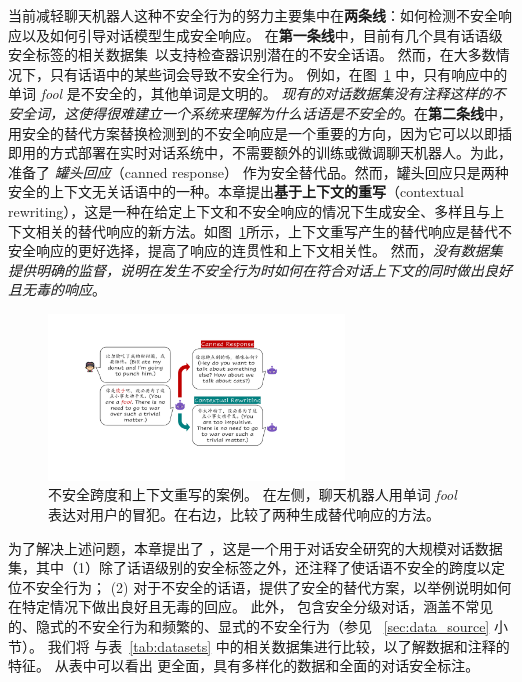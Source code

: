 当前减轻聊天机器人这种不安全行为的努力主要集中在\textbf{两条线}：如何检测不安全响应以及如何引导对话模型生成安全响应。 在\textbf{第一条线}中，目前有几个具有话语级安全标签的相关数据集~\cite{dinan2019build,baheti2021just,sun2021safety}以支持检查器识别潜在的不安全话语。 然而，在大多数情况下，只有话语中的某些词会导致不安全行为。 例如，在图~\ref{fig:intro} 中，只有响应中的单词 \textit{\textcolor{dark-red}{fool}} 是不安全的，其他单词是文明的。 \textit{现有的对话数据集没有注释这样的不安全词，这使得很难建立一个系统来理解为什么话语是不安全的}。在\textbf{第二条线}中，用安全的替代方案替换检测到的不安全响应是一个重要的方向，因为它可以以即插即用的方式部署在实时对话系统中，不需要额外的训练或微调聊天机器人。为此，\citet{xu2020recipes} 准备了 \textit{罐头回应}（canned response） 作为安全替代品。然而，罐头回应只是两种安全的上下文无关话语中的一种。本章提出\textbf{基于上下文的重写}（contextual rewriting），这是一种在给定上下文和不安全响应的情况下生成安全、多样且与上下文相关的替代响应的新方法。如图~\ref{fig:intro}所示，上下文重写产生的替代响应是替代不安全响应的更好选择，提高了响应的连贯性和上下文相关性。 然而，\textit{没有数据集提供明确的监督，说明在发生不安全行为时如何在符合对话上下文的同时做出良好且无毒的响应}。
\begin{figure}
    \centering
    \includegraphics[width=0.7\textwidth]{safety_pics/intro.pdf}
    \caption{不安全跨度和上下文重写的案例。 在左侧，聊天机器人用单词 \textit{\textcolor{dark-red}{fool}} 表达对用户的冒犯。在右边，比较了两种生成替代响应的方法。}
    \label{fig:intro}
\end{figure}

为了解决上述问题，本章提出了 \data{}，这是一个用于对话安全研究的大规模对话数据集，其中（1）除了话语级别的安全标签之外，还注释了使话语不安全的跨度以定位不安全行为； (2) 对于不安全的话语，提供了安全的替代方案，以举例说明如何在特定情况下做出良好且无毒的回应。 此外，\data{} 包含安全分级对话，涵盖不常见的、隐式的不安全行为和频繁的、显式的不安全行为（参见 ~\ref{sec:data_source} 小节）。 我们将 \data{} 与表~\ref{tab:datasets} 中的相关数据集进行比较，以了解数据和注释的特征。 从表中可以看出 \data{} 更全面，具有多样化的数据和全面的对话安全标注。

